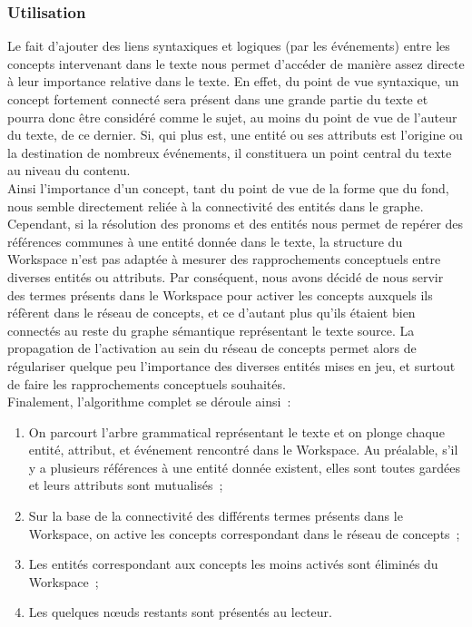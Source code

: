 \documentclass[a4paper, 12pt]{article}
\begin{document}
\subsubsection{Utilisation}

Le fait d'ajouter des liens syntaxiques et logiques (par les événements) entre les concepts intervenant dans le texte nous permet d'accéder de manière assez directe à leur importance relative dans le texte. En effet, du point de vue syntaxique, un concept fortement connecté sera présent dans une grande partie du texte et pourra donc être considéré comme le sujet, au moins du point de vue de l'auteur du texte, de ce dernier. Si, qui plus est, une entité ou ses attributs est l'origine ou la destination de nombreux événements, il constituera un point central du texte au niveau du contenu.\\

Ainsi l'importance d'un concept, tant du point de vue de la forme que du fond, nous semble directement reliée à la connectivité des entités dans le graphe. Cependant, si la résolution des pronoms et des entités nous permet de repérer des références communes à une entité donnée dans le texte, la structure du Workspace n'est pas adaptée à mesurer des rapprochements conceptuels entre diverses entités ou attributs. Par conséquent, nous avons décidé de nous servir des termes présents dans le Workspace pour activer les concepts auxquels ils réfèrent dans le réseau de concepts, et ce d'autant plus qu'ils étaient bien connectés au reste du graphe sémantique représentant le texte source. La propagation de l'activation au sein du réseau de concepts permet alors de régulariser quelque peu l'importance des diverses entités mises en jeu, et surtout de faire les rapprochements conceptuels souhaités.\\

Finalement, l'algorithme complet se déroule ainsi~:

\begin{enumerate}
	\item On parcourt l'arbre grammatical représentant le texte et on plonge chaque entité, attribut, et événement rencontré dans le Workspace. Au préalable, s'il y a plusieurs références à une entité donnée existent, elles sont toutes gardées et leurs attributs sont mutualisés~;
	\item Sur la base de la connectivité des différents termes présents dans le Workspace, on active les concepts correspondant dans le réseau de concepts~;
	\item Les entités correspondant aux concepts les moins activés sont éliminés du Workspace~;
	\item Les quelques nœuds restants sont présentés au lecteur.
\end{enumerate}
\end{document}

